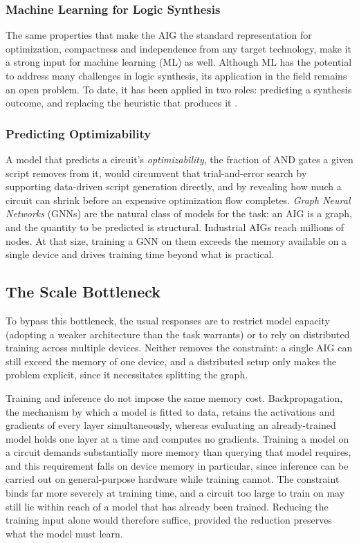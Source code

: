 \subsubsection{Machine Learning for Logic Synthesis}
\label{sec:intro:motivation:ml:field}
The same properties that make the AIG the standard representation for optimization,
compactness and independence from any target technology, make it a strong input for machine
learning (ML) as well. Although ML has the potential to address many challenges in logic
synthesis, its application in the field remains an open problem. To date, it has been applied
in two roles: predicting a synthesis outcome, and replacing the heuristic that produces it
\citep{liu2026ml4lssurvey}.

\subsubsection{Predicting Optimizability}
\label{sec:intro:motivation:ml:optimizability}
A model that predicts a circuit's \emph{optimizability}, the fraction of AND gates a given
script removes from it, would circumvent that trial-and-error search by supporting
data-driven script generation directly, and by revealing how much a circuit can shrink before
an expensive optimization flow completes. \emph{Graph Neural Networks} (GNNs) are the natural
class of models for the task: an AIG is a graph, and the quantity to be predicted is
structural. Industrial AIGs reach millions of nodes. At that size, training a GNN on them
exceeds the memory available on a single device and drives training time beyond what is
practical.

\subsection{The Scale Bottleneck}
\label{sec:intro:motivation:scale}
To bypass this bottleneck, the usual responses are to restrict model capacity (adopting a
weaker architecture than the task warrants) or to rely on distributed training across
multiple devices. Neither removes the constraint: a single AIG can still exceed the memory of
one device, and a distributed setup only makes the problem explicit, since it necessitates
splitting the graph.

Training and inference do not impose the same memory cost. Backpropagation, the mechanism by
which a model is fitted to data, retains the activations and gradients of every layer
simultaneously, whereas evaluating an already-trained model holds one layer at a time and
computes no gradients. Training a model on a circuit demands substantially more memory than
querying that model requires, and this requirement falls on device memory in particular,
since inference can be carried out on general-purpose hardware while training cannot. The
constraint binds far more severely at training time, and a circuit too large to train on may
still lie within reach of a model that has already been trained. Reducing the training input
alone would therefore suffice, provided the reduction preserves what the model must learn.


